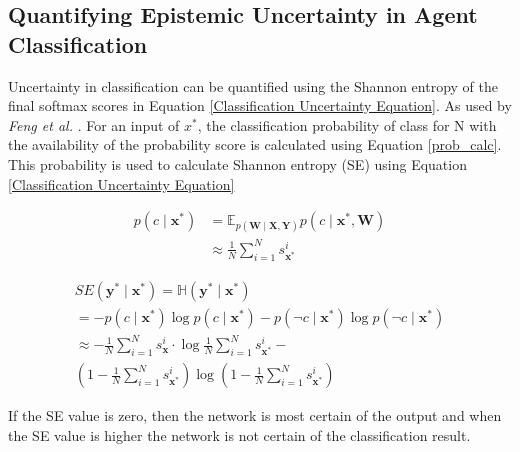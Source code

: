 \documentclass[10pt,twocolumn,letterpaper]{article}
\begin{document}
\subsection{Quantifying Epistemic Uncertainty in Agent Classification}
        \label{uncertainty in classification}
        Uncertainty in classification can be quantified using the Shannon entropy of the final softmax scores in Equation \ref{Classification Uncertainty Equation}. As used by \textit{Feng et al.} \cite{Feng2018}. For an input of $x^{*}$, the classification probability of class for N with the availability of the probability score is calculated using Equation \ref{prob_calc}. This probability is used to calculate Shannon entropy (SE) using Equation \ref{Classification Uncertainty Equation}

        \begin{equation}
            \label{prob_calc}
            \begin{aligned}
                p\left(c \mid \mathbf{x}^{*}\right) &=\mathbb{E}_{p(\mathbf{W} \mid \mathbf{X}, \mathbf{Y})} p\left(c \mid \mathbf{x}^{*}, \mathbf{W}\right) \\
                & \approx \frac{1}{N} \sum_{i=1}^{N} s_{\mathbf{x}^{*}}^{i}
            \end{aligned}
        \end{equation}
        
        \begin{equation}
            \label{Classification Uncertainty Equation}
            \begin{array}{l}
                S E\left(\mathbf{y}^{*} \mid \mathbf{x}^{*}\right)=\mathbb{H}\left(\mathbf{y}^{*} \mid \mathbf{x}^{*}\right) \\
                =-p\left(c \mid \mathbf{x}^{*}\right) \log p\left(c \mid \mathbf{x}^{*}\right)-p\left(\neg c \mid \mathbf{x}^{*}\right) \log p\left(\neg c \mid \mathbf{x}^{*}\right) \\
                \approx-\frac{1}{N} \sum_{i=1}^{N} s_{\mathbf{x}}^{i} \cdot \log \frac{1}{N} \sum_{i=1}^{N} s_{\mathbf{x}^{*}}^{i}- \\ \left(1-\frac{1}{N} \sum_{i=1}^{N} s_{\mathbf{x}^{*}}^{i}\right) \log \left(1-\frac{1}{N} \sum_{i=1}^{N} s_{\mathbf{x}^{*}}^{i}\right)
            \end{array}
        \end{equation}
        
        If the SE value is zero, then the network is most certain of the output and when the SE value is higher the network is not certain of the classification result.
        
\end{document}
